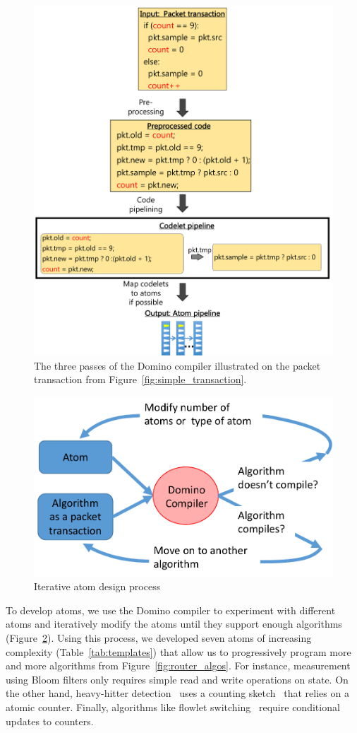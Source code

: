 \begin{figure}[!t]
\includegraphics[width=\textwidth]{compiler_passes_example.pdf}
\caption{The three passes of the Domino compiler illustrated on the packet transaction from Figure~\ref{fig:simple_transaction}.}
\label{fig:compiler_passes_example}
\end{figure}

\begin{figure}
\centering
\includegraphics[width=0.4\columnwidth]{iterative_design_process.pdf}
\caption{Iterative atom design process}
\label{fig:iterative_design}
\end{figure}

To develop atoms, we use the Domino compiler to experiment with different atoms
and iteratively modify the atoms until they support enough algorithms
(Figure~\ref{fig:iterative_design}).  Using this process, we developed seven
atoms of increasing complexity (Table~\ref{tab:templates}) that allow us to
progressively program more and more algorithms from
Figure~\ref{fig:router_algos}. For instance, measurement using Bloom filters
only requires simple read and write operations on state. On the other hand,
heavy-hitter detection~\cite{opensketch} uses a counting
sketch~\cite{count_min} that relies on a atomic counter. Finally, algorithms
like flowlet switching~\cite{flare} require conditional updates to counters.

